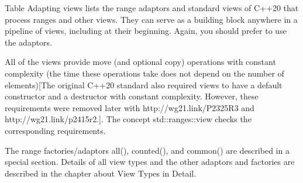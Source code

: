 Table Adapting views lists the range adaptors and standard views of C++20 that process ranges and other views. They can serve as a building block anywhere in a pipeline of views, including at their beginning. Again, you should prefer to use the adaptors.

All of the views provide move (and optional copy) operations with constant complexity (the time these operations take does not depend on the number of elements)[The original C++20 standard also required views to have a default constructor and a destructor with constant complexity. However, these requirements were removed later with http://wg21.link/P2325R3 and http://wg21.link/p2415r2.]. The concept std::ranges::view checks the corresponding requirements.

The range factories/adaptors all(), counted(), and common() are described in a special section. Details of all view types and the other adaptors and factories are described in the chapter about View Types in Detail.

